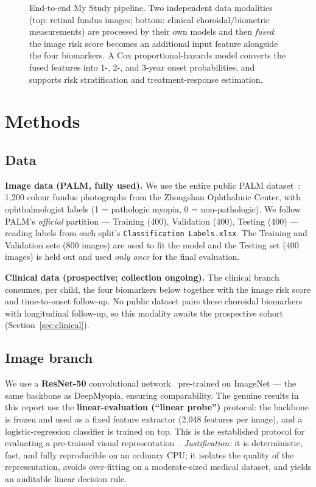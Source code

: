 \documentclass[11pt]{article}
\begin{document}
\begin{figure}[H]
\centering
\resizebox{\textwidth}{!}{%

}
\caption{End-to-end My Study pipeline. Two independent data modalities (top:
retinal fundus images; bottom: clinical choroidal/biometric measurements) are
processed by their own models and then \emph{fused}: the image risk score becomes
an additional input feature alongside the four biomarkers. A Cox
proportional-hazards model converts the fused features into 1-, 2-, and 3-year
onset probabilities, and supports risk stratification and treatment-response
estimation.}
\label{fig:pipeline}
\end{figure}

\section{Methods}

\subsection{Data}
\textbf{Image data (PALM, fully used).} We use the entire public PALM
dataset~\cite{palm}: 1{,}200 colour fundus photographs from the Zhongshan
Ophthalmic Center, with ophthalmologist labels (1 = pathologic myopia,
0 = non-pathologic). We follow PALM's \emph{official} partition --- Training (400),
Validation (400), Testing (400) --- reading labels from each split's
\texttt{Classification Labels.xlsx}. The Training and Validation sets (800 images)
are used to fit the model and the Testing set (400 images) is held out and used
\emph{only once} for the final evaluation.

\textbf{Clinical data (prospective; collection ongoing).} The clinical branch
consumes, per child, the four biomarkers below together with the image risk score
and time-to-onset follow-up. No public dataset pairs these choroidal biomarkers
with longitudinal follow-up, so this modality awaits the prospective cohort
(Section~\ref{sec:clinical}).

\subsection{Image branch}\label{sec:image}
We use a \textbf{ResNet-50} convolutional network~\cite{resnet} pre-trained on
ImageNet --- the same backbone as DeepMyopia, ensuring comparability. The genuine
results in this report use the \textbf{linear-evaluation (``linear probe'')}
protocol: the backbone is frozen and used as a fixed feature extractor (2{,}048
features per image), and a logistic-regression classifier is trained on top. This
is the established protocol for evaluating a pre-trained visual
representation~\cite{simclr}. \emph{Justification:} it is deterministic, fast, and
fully reproducible on an ordinary CPU; it isolates the quality of the
representation, avoids over-fitting on a moderate-sized medical dataset, and
yields an auditable linear decision rule.
\end{document}
